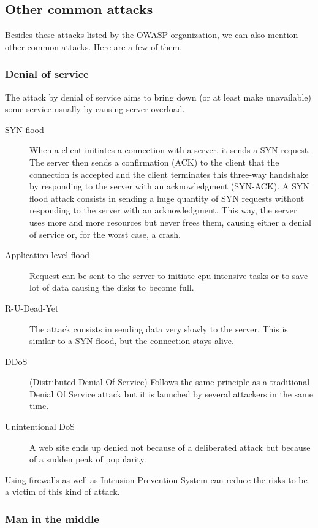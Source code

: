 \subsection{Other common attacks}

Besides these attacks listed by the OWASP organization, we can also mention
other common attacks. Here are a few of them.

\subsubsection{Denial of service}

The attack by denial of service aims to bring down (or at least make
unavailable) some service usually by causing server overload.

\begin{description}
\item[SYN flood]
When a client initiates a connection with a server, it sends a SYN request.
The server then sends a confirmation (ACK) to the client that the connection
is accepted and the client terminates this three-way handshake by responding
to the server with an acknowledgment (SYN-ACK).
A SYN flood attack consists in sending a huge quantity of SYN
requests without responding to the server with an acknowledgment. This way, the
server uses more and more resources but never frees them, causing either a denial
of service or, for the worst case, a crash.
\item[Application level flood]
Request can be sent to the server to initiate cpu-intensive tasks or to save
lot of data causing the disks to become full.
\item[R-U-Dead-Yet]
The attack consists in sending data very slowly to the server. This is similar
to a SYN flood, but the connection stays alive.
\item[DDoS] (Distributed Denial Of Service)
Follows the same principle as a traditional Denial Of Service attack but it is
launched by several attackers in the same time.
\item[Unintentional DoS]
A web site ends up denied not because of a deliberated attack but because of a
sudden peak of popularity.
\end{description}
Using firewalls as well as Intrusion Prevention System can reduce the risks to
be a victim of this kind of attack.

\subsubsection{Man in the middle}

